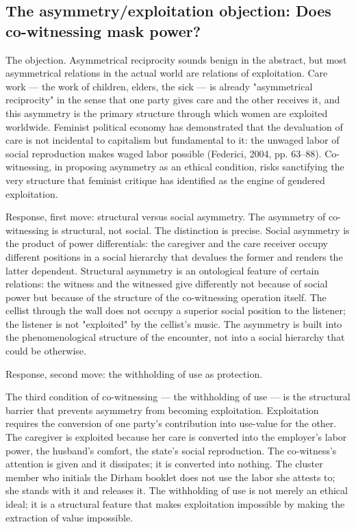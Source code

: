 \subsection{The asymmetry/exploitation objection: Does co-witnessing mask power?}

The objection. Asymmetrical reciprocity sounds benign in the abstract, but most asymmetrical relations in the actual world are relations of exploitation. Care work — the work of children, elders, the sick — is already "asymmetrical reciprocity" in the sense that one party gives care and the other receives it, and this asymmetry is the primary structure through which women are exploited worldwide. Feminist political economy has demonstrated that the devaluation of care is not incidental to capitalism but fundamental to it: the unwaged labor of social reproduction makes waged labor possible (Federici, 2004, pp. 63–88). Co-witnessing, in proposing asymmetry as an ethical condition, risks sanctifying the very structure that feminist critique has identified as the engine of gendered exploitation.

Response, first move: structural versus social asymmetry. The asymmetry of co-witnessing is structural, not social. The distinction is precise. Social asymmetry is the product of power differentials: the caregiver and the care receiver occupy different positions in a social hierarchy that devalues the former and renders the latter dependent. Structural asymmetry is an ontological feature of certain relations: the witness and the witnessed give differently not because of social power but because of the structure of the co-witnessing operation itself. The cellist through the wall does not occupy a superior social position to the listener; the listener is not "exploited" by the cellist's music. The asymmetry is built into the phenomenological structure of the encounter, not into a social hierarchy that could be otherwise.

Response, second move: the withholding of use as protection.

The third condition of co-witnessing — the withholding of use — is the structural barrier that prevents asymmetry from becoming exploitation. Exploitation requires the conversion of one party's contribution into use-value for the other. The caregiver is exploited because her care is converted into the employer's labor power, the husband's comfort, the state's social reproduction. The co-witness's attention is given and it dissipates; it is converted into nothing. The cluster member who initials the Dirham booklet does not use the labor she attests to; she stands with it and releases it. The withholding of use is not merely an ethical ideal; it is a structural feature that makes exploitation impossible by making the extraction of value impossible.

